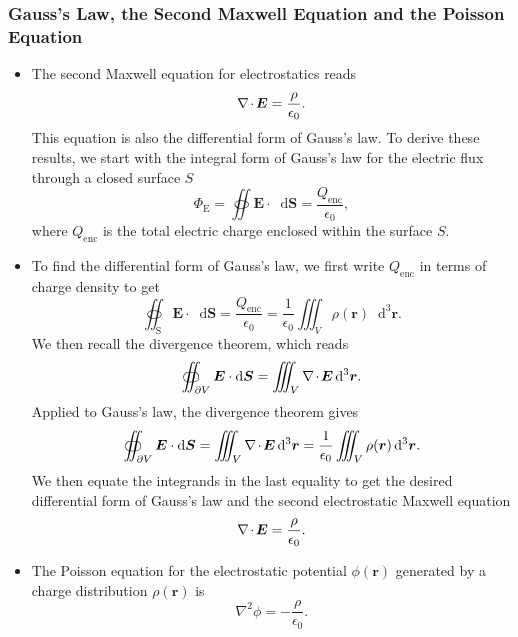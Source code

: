 \documentclass[11pt, a4paper]{article}
\newcommand{\diff}{\mathop{}\!\mathrm{d}} %
\newcommand{\dr}{\diff^{3} \r}  %
\renewcommand{\vec}[1]{\bm{#1}} %
\renewcommand{\r}{\vec{r}}
\newcommand{\E}{\vec{E}} %
\newcommand{\ee}{\epsilon_{0}}  %
\renewcommand{\div}{\nabla \mspace{-2mu} \cdot \mspace{-2mu}}
\renewcommand{\laplacian}{\nabla^{2}}
\begin{document}
\subsubsection{Gauss's Law, the Second Maxwell Equation and the Poisson Equation}
\begin{itemize}
    \item The second Maxwell equation for electrostatics reads
    \begin{equation*}
        \div \E = \frac{\rho}{\ee}.
    \end{equation*}
    This equation is also the differential form of Gauss's law. To derive these results, we start with the integral form of Gauss's law for the electric flux through a closed surface $ S $
    \begin{equation*}
        \Phi_{\text{E}} = \oiint \E \cdot \diff \vec{S} = \frac{Q_{\text{enc}}}{\ee},
    \end{equation*}
    where $ Q_{\text{enc}} $ is the total electric charge enclosed within the surface $ S $. 
    
	\item To find the differential form of Gauss's law, we first write $ Q_{\text{enc}} $ in terms of charge density to get
	\begin{equation*}
        \oiint_{\text{S}} \E \cdot \diff \vec{S} = \frac{Q_{\text{enc}}}{\ee} = \frac{1}{\ee}\iiint_{V}\rho(\r) \dr.
	\end{equation*}
	We then recall the divergence theorem, which reads
	\begin{equation*}
		\oiint_{\partial V} \E \cdot \diff \vec{S} = \iiint_{V}\div \E \dr.
	\end{equation*}
	Applied to Gauss's law, the divergence theorem gives
	\begin{equation*}
		\oiint_{\partial V} \E \cdot \diff \vec{S} = \iiint_{V}\div \E \dr = \frac{1}{\ee} \iiint_{V} \rho(\r) \dr.
	\end{equation*}
	We then equate the integrands in the last equality to get the desired differential form of Gauss's law and the second electrostatic Maxwell equation
	\begin{equation*}
		\div \E = \frac{\rho}{\ee}.
	\end{equation*}

    \item The Poisson equation for the electrostatic potential $ \phi(\r) $ generated by a charge distribution $ \rho(\r) $ is
    \begin{equation*}
        \laplacian \phi = - \frac{\rho}{\ee}.
    \end{equation*}
    

\end{itemize}
\end{document}

